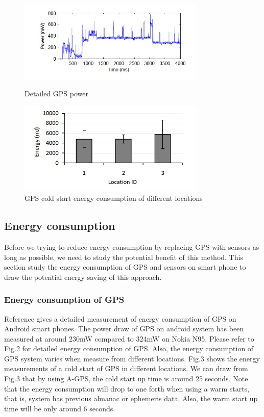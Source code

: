 \documentclass[journal]{IEEEtran}
\begin{document}
\begin{figure}
	\centering
	\includegraphics[width=3.5in]{figures/dpower}
	\caption{Detailed GPS power \cite{GPS Measurements} }
	\includegraphics[width=3.5in]{figures/csenergy}
	\caption{GPS cold start energy consumption of different locations \cite{GPS Measurements} }
\end{figure}

\subsection{Energy consumption}
Before we trying to reduce energy consumption by replacing GPS with sensors as long as possible, we need to study the potential benefit of this method. 
This section study the energy consumption of GPS and sensors on smart phone to draw the potential energy saving of this approach. 

\subsubsection{Energy consumption of GPS} 
Reference \cite{GPS Measurements} gives a detailed measurement of energy consumption of GPS on Android smart phones. 
The power draw of GPS on android system has been measured at around 230mW compared to 324mW on Nokia N95. 
Please refer to Fig.2 for detailed energy consumption of GPS. 
Also, the energy consumption of GPS system varies when measure from different locations.
Fig.3 shows the energy measurements of a cold start of GPS in different locations.
We can draw from Fig.3 that by using A-GPS, the cold start up time is around 25 seconds.
Note that the energy consumption will drop to one forth when using a warm starts, that is, system has previous almanac or ephemeris data. 
Also, the warm start up time will be only around 6 seconds. 
\end{document}
